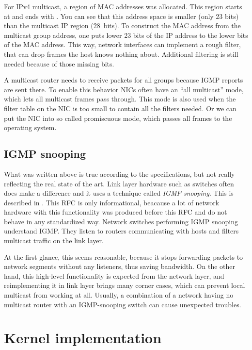For IPv4 multicast, a region of MAC addresses was allocated. This region starts
at  and ends with . You can see
that this address space is smaller (only 23 bits) than the multicast IP region
(28~bits). To construct the MAC address from the multicast group address, one
puts lower 23 bits of the IP address to the lower bits of the MAC address. This
way, network interfaces can implement a rough filter, that can drop frames the
host knows nothing about. Additional filtering is still needed because of those
missing bits.

A multicast router needs to receive packets for all groups because IGMP reports
are sent there. To enable this behavior NICs often have an ``all multicast''
mode, which lets all multicast frames pass through. This mode is also used when
the filter table on the NIC is too small to contain all the filters needed. Or
we can put the NIC into so called promiscuous mode, which passes all frames
to the operating system.

\subsection{IGMP snooping}

What was written above is true according to the specifications, but not really
reflecting the real state of the art. Link layer hardware such as switches often does
make a difference and it uses a technique called \emph{IGMP snooping}. This is described
in . This RFC is only informational, beacause a lot of network hardware with
this functionality was produced before this RFC and do not behave in any
standardized way. Network switches performing IGMP snooping understand IGMP. They
listen to routers communicating with hosts and filters multicast traffic on
the link layer.

At the first glance, this seems reasonable, because it stops forwarding packets
to network segments without any listeners, thus saving bandwidth. On the other
hand, this high-level functionality is expected from the network layer, and
reimplementing it in link layer brings many corner cases, which can prevent
local multicast from working at all. Usually, a combination of a network having no
multicast router with an IGMP-snooping switch can cause unexpected troubles.

\section{Kernel implementation}

